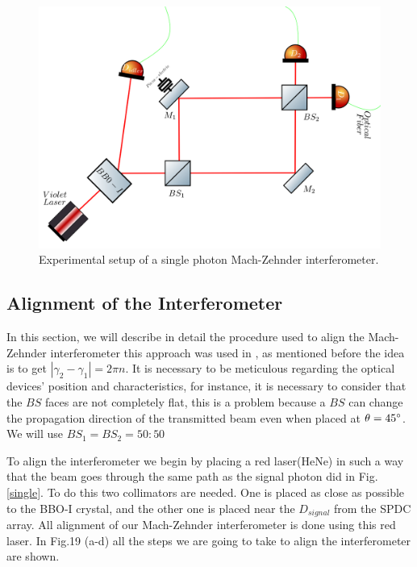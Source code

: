 \documentclass[12pt]{book}
\begin{document}
\begin{figure}[t!]
\centering
\includegraphics[width=\linewidth]{images/machzehnder_single.png}
\caption{Experimental setup of a single photon Mach-Zehnder interferometer.}
\label{newsingle}
\end{figure}

\subsection{Alignment of the Interferometer}

In this section, we will describe in detail the procedure used to align the Mach-Zehnder interferometer this approach was used in \cite{zuri}, as mentioned before the idea is to get $|\gamma_{2}-\gamma_{1}|=2\pi n$. It is necessary to be meticulous regarding the optical devices' position and characteristics, for instance, it is necessary to consider that the $BS$ faces are not completely flat, this is a problem because a $BS$ can change the propagation direction of the transmitted beam even when placed at $\theta=45\degree$. We will use $BS_{1}=BS_{2}=50:50$

To align the interferometer we begin by placing a red laser(HeNe) in such a way that the beam goes through the same path as the signal photon did in Fig. \ref{single}. To do this two collimators are needed. One is placed as close as possible to the BBO-I crystal, and the other one is placed near the $D_{signal}$ from the SPDC array. All alignment of our Mach-Zehnder interferometer is done using this red laser. In Fig.19 (a-d) all the steps we are going to take to align the interferometer are shown.
\end{document}
